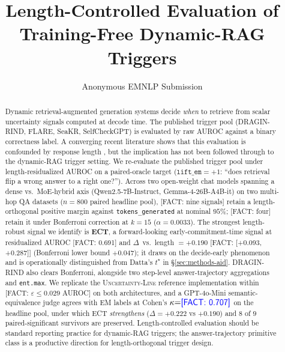 \documentclass[11pt]{article}
\title{Length-Controlled Evaluation of Training-Free Dynamic-RAG Triggers}
\author{Anonymous EMNLP Submission}
\date{}
\newcommand{\FACT}[1]{{\color{blue}\textsf{[FACT: #1]}}}
\begin{document}
\maketitle

\begin{abstract}
Dynamic retrieval-augmented generation systems decide \emph{when} to retrieve
from scalar uncertainty signals computed at decode time. The published trigger
pool (DRAGIN-RIND, FLARE, SeaKR, SelfCheckGPT) is evaluated by raw AUROC
against a binary correctness label.
A converging recent literature shows that this evaluation
is confounded by response length
\citep{Santilli_RevisitingUQEvaluationLengthBias,
Vashurin_UncertaintyLineLengthInvariant,
Janiak_IllusionProgressHallucinationDetection,
Zhang_VerbosityVeracityVCBehavior,
Ielanskyi_PitfallsUQEvaluationNLG}, but the implication has not been
followed through to the dynamic-RAG trigger setting.
We re-evaluate the published trigger pool under length-residualized AUROC
\citep{Vashurin_UncertaintyLineLengthInvariant} on a paired-oracle target
($\texttt{lift\_em}{=}+1$: ``does retrieval flip a wrong answer to a right
one?''). Across two open-weight chat models spanning a dense vs.\
MoE-hybrid axis (Qwen2.5-7B-Instruct, Gemma-4-26B-A4B-it) on two
multi-hop QA datasets ($n{=}800$ paired headline pool), \FACT{nine
signals} retain a length-orthogonal positive margin against
\texttt{tokens\_generated} at nominal $95\%$; \FACT{four} retain it under
Bonferroni correction at $k{=}15$ ($\alpha=0.0033$). The strongest
length-robust signal we identify is \textbf{ECT}, a forward-looking
early-commitment-time signal at residualized AUROC \FACT{0.691} and
$\Delta$~vs.\ length $={+}0.190$ \FACT{[+0.093, +0.287]} (Bonferroni
lower bound $+0.047$); it draws on the decide-early phenomenon
\citep{Datta_DecideEarlyExplainLater, Wang_ChainOfProbeCoTStepByStep,
Chen_DynamicInstabilityLLMReasoning} and is operationally distinguished
from Datta's $t^\star$ in \S\ref{sec:methods-aid}. DRAGIN-RIND
\citep{Su_DRAGIN} also clears Bonferroni, alongside two step-level
answer-trajectory aggregations and \texttt{ent.max}. We replicate the
\textsc{Uncertainty-Line} reference implementation within
\FACT{$\varepsilon \leq 0.029$ AUROC} on both architectures, and a
GPT-4o-Mini semantic-equivalence judge agrees with EM labels at Cohen's
$\kappa{=}\FACT{0.707}$ on the headline pool, under which ECT
\emph{strengthens} ($\Delta{=}+0.222$ vs $+0.190$) and $8$ of $9$
paired-significant survivors are preserved. Length-controlled evaluation
should be standard reporting practice for dynamic-RAG triggers; the
answer-trajectory primitive class is a productive direction for
length-orthogonal trigger design.
\end{abstract}
\end{document}
